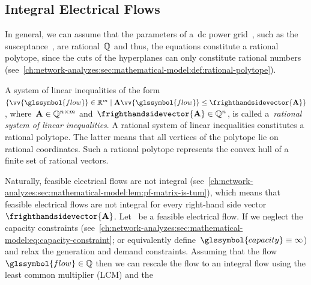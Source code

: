 \subsection{Integral Electrical Flows}
\label{ch:network-analyzes:sec:mathematical-model:subsec:integral-power-flows}
% 
In general, we can assume that the parameters of a~\gls{dc} power
grid~, such as the susceptance~, are
rational~$\mathbb{Q}$ and thus, the equations constitute a rational polytope,
since the cuts of the hyperplanes can only constitute rational numbers
(see~\cref{ch:network-analyzes:sec:mathematical-model:def:rational-polytope}).
% 
\begin{definition}
    A system of linear inequalities of the
    form~$
    \{
        \vv{\glssymbol{flow}}
        \in
        \reals^m
        \mid
        \constraintmatrix
        \vv{\glssymbol{flow}}
        \leq
        \frighthandsidevector{\constraintmatrix}\}
    $,
    where~$
    \mathbf{A}
    \in
    \mathbb{Q}^{n\times m}
    $ and~$
    \frighthandsidevector{\constraintmatrix}
    \in
    \rationals^{n}
    $, is called a~\emph{rational system of linear inequalities}. A rational
    system of linear inequalities constitutes a rational polytope. The latter
    means that all vertices of the polytope lie on rational coordinates. Such a
    rational polytope represents the convex hull of a finite set of rational
    vectors.
    \label{ch:network-analyzes:sec:mathematical-model:def:rational-polytope}
\end{definition}%
% 
Naturally, feasible electrical flows are not integral
(see~\cref{ch:network-analyzes:sec:mathematical-model:lem:pf-matrix-is-tum}),
which means that feasible electrical flows are not integral for every right-hand
side vector~$\frighthandsidevector{ \constraintmatrix }$.
% 
Let~ be a feasible electrical flow. If we neglect the capacity
constraints
(see~\cref{ch:network-analyzes:sec:mathematical-model:eq:capacity-constraint};
or equivalently define~$
    \glssymbol{capacity}
    \equiv
    \infty
$) and relax the generation and demand constraints.
% 
% 
Assuming that the flow~$\glssymbol{flow}\in\rationals$ then we can rescale the
flow to an integral flow using the least common multiplier (LCM) and the
